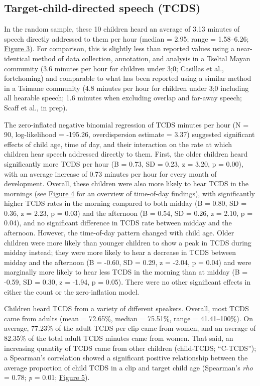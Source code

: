 \documentclass[,man,floatsintext]{apa6}
\begin{document}
\subsection{Target-child-directed speech
(TCDS)}\label{target-child-directed-speech-tcds}

In the random sample, these 10 children heard an average of 3.13 minutes
of speech directly addressed to them per hour (median = 2.95; range =
1.58--6.26; \protect\hyperlink{fig3}{Figure 3}). For comparison, this is
slightly less than reported values using a near-identical method of data
collection, annotation, and analysis in a Tseltal Mayan community (3.6
minutes per hour for children under 3;0; Casillas et al., fortchoming)
and comparable to what has been reported using a similar method in a
Tsimane community (4.8 minutes per hour for children under 3;0 including
all hearable speech; 1.6 minutes when excluding overlap and far-away
speech; Scaff et al., in prep).

The zero-inflated negative binomial regression of TCDS minutes per hour
(N = 90, log-likelihood = -195.26, overdispersion estimate = 3.37)
suggested significant effects of child age, time of day, and their
interaction on the rate at which children hear speech addressed directly
to them. First, the older children heard significantly more TCDS per
hour (B = 0.73, SD = 0.23, z = 3.20, p = 0.00), with an average increase
of 0.73 minutes per hour for every month of development. Overall, these
children were also more likely to hear TCDS in the mornings (see
\protect\hyperlink{fig4}{Figure 4} for an overview of time-of-day
findings), with significantly higher TCDS rates in the morning compared
to both midday (B = 0.80, SD = 0.36, z = 2.23, p = 0.03) and the
afternoon (B = 0.54, SD = 0.26, z = 2.10, p = 0.04), and no significant
difference in TCDS rate between midday and the afternoon. However, the
time-of-day pattern changed with child age. Older children were more
likely than younger children to show a peak in TCDS during midday
instead; they were more likely to hear a decrease in TCDS between midday
and the afternoon (B = -0.60, SD = 0.29, z = -2.04, p = 0.04) and were
marginally more likely to hear less TCDS in the morning than at midday
(B = -0.59, SD = 0.30, z = -1.94, p = 0.05). There were no other
significant effects in either the count or the zero-inflation model.

Children heard TCDS from a variety of different speakers. Overall, most
TCDS came from adults (mean = 72.65\%, median = 75.51\%, range =
41.41--100\%). On average, 77.23\% of the adult TCDS per clip came from
women, and an average of 82.35\% of the total adult TCDS minutes came
from women. That said, an increasing quantity of TCDS came from other
children (child-TCDS; \enquote{C-TCDS}); a Spearman's correlation showed
a significant positive relationship between the average proportion of
child TCDS in a clip and target child age (Spearman's \emph{rho} = 0.78;
\emph{p} = 0.01; \protect\hyperlink{fig5}{Figure 5}).
\end{document}
